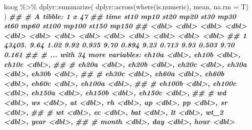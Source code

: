 \documentclass[
]{article}
\newenvironment{Shaded}{\begin{snugshade}}{\end{snugshade}}
\newcommand{\AttributeTok}[1]{\textcolor[rgb]{0.77,0.63,0.00}{#1}}
\newcommand{\DocumentationTok}[1]{\textcolor[rgb]{0.56,0.35,0.01}{\textbf{\textit{#1}}}}
\newcommand{\FunctionTok}[1]{\textcolor[rgb]{0.00,0.00,0.00}{#1}}
\newcommand{\NormalTok}[1]{#1}
\newcommand{\SpecialCharTok}[1]{\textcolor[rgb]{0.00,0.00,0.00}{#1}}
\begin{document}
\begin{Shaded}
\begin{Highlighting}[]
\NormalTok{koog }\SpecialCharTok{\%\textgreater{}\%}
\NormalTok{  dplyr}\SpecialCharTok{::}\FunctionTok{summarize}\NormalTok{(}
\NormalTok{    dplyr}\SpecialCharTok{::}\FunctionTok{across}\NormalTok{(}\FunctionTok{where}\NormalTok{(is.numeric), mean, }\AttributeTok{na.rm =}\NormalTok{ T)}
\NormalTok{    )}
\DocumentationTok{\#\# \# A tibble: 1 x 47}
\DocumentationTok{\#\#     time  st10  mp10  st20  mp20  st30  mp30  st60  mp60 st100 mp100 st150 mp150}
\DocumentationTok{\#\#    \textless{}dbl\textgreater{} \textless{}dbl\textgreater{} \textless{}dbl\textgreater{} \textless{}dbl\textgreater{} \textless{}dbl\textgreater{} \textless{}dbl\textgreater{} \textless{}dbl\textgreater{} \textless{}dbl\textgreater{} \textless{}dbl\textgreater{} \textless{}dbl\textgreater{} \textless{}dbl\textgreater{} \textless{}dbl\textgreater{} \textless{}dbl\textgreater{}}
\DocumentationTok{\#\# 1 43405.  9.64  1.02  9.92 0.935  9.70 0.894  9.23 0.713  9.93 0.503  9.70 0.161}
\DocumentationTok{\#\# \# ... with 34 more variables: eh10a \textless{}dbl\textgreater{}, eh10b \textless{}dbl\textgreater{}, eh10c \textless{}dbl\textgreater{},}
\DocumentationTok{\#\# \#   eh20a \textless{}dbl\textgreater{}, eh20b \textless{}dbl\textgreater{}, eh20c \textless{}dbl\textgreater{}, eh30a \textless{}dbl\textgreater{}, eh30b \textless{}dbl\textgreater{},}
\DocumentationTok{\#\# \#   eh30c \textless{}dbl\textgreater{}, eh60a \textless{}dbl\textgreater{}, eh60b \textless{}dbl\textgreater{}, eh60c \textless{}dbl\textgreater{}, eh100a \textless{}dbl\textgreater{},}
\DocumentationTok{\#\# \#   eh100b \textless{}dbl\textgreater{}, eh100c \textless{}dbl\textgreater{}, eh150a \textless{}dbl\textgreater{}, eh150b \textless{}dbl\textgreater{}, eh150c \textless{}dbl\textgreater{},}
\DocumentationTok{\#\# \#   wd \textless{}dbl\textgreater{}, ws \textless{}dbl\textgreater{}, at \textless{}dbl\textgreater{}, rh \textless{}dbl\textgreater{}, ap \textless{}dbl\textgreater{}, pp \textless{}dbl\textgreater{}, sr \textless{}dbl\textgreater{},}
\DocumentationTok{\#\# \#   wt \textless{}dbl\textgreater{}, ec \textless{}dbl\textgreater{}, bat \textless{}dbl\textgreater{}, lt \textless{}dbl\textgreater{}, wt\_2 \textless{}dbl\textgreater{}, year \textless{}dbl\textgreater{},}
\DocumentationTok{\#\# \#   month \textless{}dbl\textgreater{}, day \textless{}dbl\textgreater{}, hour \textless{}dbl\textgreater{}}
\end{Highlighting}
\end{Shaded}
\end{document}
